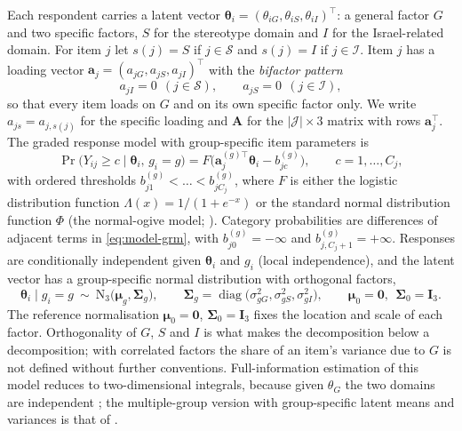 Each respondent carries a latent vector $\bm\theta_i=(\theta_{iG},\theta_{iS},\theta_{iI})^\top$: a general factor $G$ and two specific factors, $S$ for the stereotype domain and $I$ for the Israel-related domain. For item $j$ let $s(j)=S$ if $j\in\mathcal S$ and $s(j)=I$ if $j\in\mathcal I$. Item $j$ has a loading vector $\bm a_j=(a_{jG},a_{jS},a_{jI})^\top$ with the \emph{bifactor pattern}
\begin{equation}\label{eq:model-pattern}
  a_{jI}=0\ \ (j\in\mathcal S),\qquad a_{jS}=0\ \ (j\in\mathcal I),
\end{equation}
so that every item loads on $G$ and on its own specific factor only. We write $a_{js}=a_{j,s(j)}$ for the specific loading and $\bm A$ for the $|\mathcal J|\times3$ matrix with rows $\bm a_j^\top$. The graded response model \citep{samejima1969} with group-specific item parameters is
\begin{equation}\label{eq:model-grm}
  \Pr\bigl(Y_{ij}\ge c\mid\bm\theta_i,\,g_i=g\bigr)=F\bigl(\bm a_j^{(g)\top}\bm\theta_i-b_{jc}^{(g)}\bigr),\qquad c=1,\dots,C_j,
\end{equation}
with ordered thresholds $b_{j1}^{(g)}<\dots<b_{jC_j}^{(g)}$, where $F$ is either the logistic distribution function $\Lambda(x)=1/(1+e^{-x})$ or the standard normal distribution function $\Phi$ (the normal-ogive model; \citealp{lord1980}). Category probabilities are differences of adjacent terms in \eqref{eq:model-grm}, with $b_{j0}^{(g)}=-\infty$ and $b_{j,C_j+1}^{(g)}=+\infty$. Responses are conditionally independent given $\bm\theta_i$ and $g_i$ (local independence), and the latent vector has a group-specific normal distribution with orthogonal factors,
\begin{equation}\label{eq:model-latent}
  \bm\theta_i\mid g_i=g\ \sim\ \mathrm N_3\bigl(\bm\mu_g,\bm\Sigma_g\bigr),\qquad
  \bm\Sigma_g=\operatorname{diag}\bigl(\sigma^2_{gG},\sigma^2_{gS},\sigma^2_{gI}\bigr),\qquad
  \bm\mu_0=\bm0,\ \ \bm\Sigma_0=\bm I_3 .
\end{equation}
The reference normalisation $\bm\mu_0=\bm0$, $\bm\Sigma_0=\bm I_3$ fixes the location and scale of each factor. Orthogonality of $G$, $S$ and $I$ is what makes the decomposition below a decomposition; with correlated factors the share of an item's variance due to $G$ is not defined without further conventions. Full-information estimation of this model reduces to two-dimensional integrals, because given $\theta_{G}$ the two domains are independent \citep{gibbons1992,gibbons2007}; the multiple-group version with group-specific latent means and variances is that of \citet{cai2011}.

